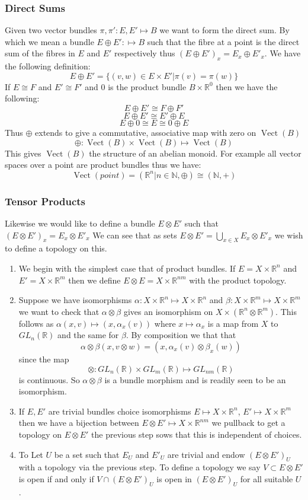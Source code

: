 \documentclass[a4paper,10pt]{article}
\theoremstyle{plain}%
\theoremstyle{definition}
\theoremstyle{remark}
\newcommand{\NN}{\mathbb{N}}
\newcommand{\RR}{\mathbb{R}}
\DeclareMathOperator{\Vect}{Vect}
\begin{document}
\subsubsection{Direct Sums}

Given two vector bundles $\pi,\pi':E,E'\mapsto B$ we want to form the direct sum. By which we mean a bundle 
$E\oplus E':\mapsto B$ such that the fibre at a point is the direct sum of the fibres in $E$
and $E'$ respectively thus $(E\oplus E')_x=E_x\oplus E'_x$. We have the following definition:
$$E\oplus E' = \{(v,w)\in E\times E' | \pi(v)=\pi(w) \}$$
If $E\cong F$ and $E'\cong F'$ and $0$ is the product bundle $B\times \RR^0$ then we have the following:
$$ E\oplus E'\cong F\oplus F'$$
$$ E\oplus E'\cong E'\oplus E$$
$$ E\oplus 0\cong E \cong 0\oplus E$$
Thus $\oplus$ extends to give a commutative, associative map with zero on $\Vect(B)$
$$\oplus :\Vect(B)\times \Vect(B)\mapsto \Vect(B)$$
This gives $\Vect(B)$ the structure of an abelian monoid. For example all vector spaces over a point
are product bundles thus we have:
$$\Vect(point)=({\RR^n|n\in\NN},\oplus)\cong (\NN,+)$$

\subsubsection{Tensor Products}

Likewise we would like to define a bundle $E\otimes E'$ such that $(E\otimes E')_x=E_x\otimes E'_x$
We can see that as sets $E\otimes E'=\bigcup_{x\in X}E_x\otimes E'_x$ we wish to define a topology on this.
\begin{enumerate}
 \item We begin with the simplest case that of product bundles. If $E=X\times \RR^n$ and $E'=X\times \RR^m$ 
then we define $E\otimes E = X\times \RR^{n m}$ with the product topology.
 \item Suppose we have isomorphisms $\alpha:X\times\RR^n\mapsto X\times\RR^n$ and 
$\beta:X\times\RR^m\mapsto X\times\RR^m$ we want to check that $\alpha\otimes\beta$ gives an
isomorphism on $X\times(\RR^n\otimes\RR^m)$. This follows as $\alpha(x,v)\mapsto(x,\alpha_x(v))$ where 
$x\mapsto\alpha_x$ is a map from $X$ to $GL_n(\RR)$ and the same for $\beta$. By composition we that that
$$\alpha\otimes\beta(x,v\otimes w)=(x,\alpha_x(v)\otimes\beta_x(w))$$
since the map
$$\otimes:GL_n(\RR)\times GL_m(\RR)\mapsto GL_{n m}(\RR)$$
is continuous. So $\alpha\otimes\beta$ is a bundle morphism and is readily seen to be an isomorphism. 
 \item If $E, E'$ are trivial bundles choice isomorphisms $E\mapsto X\times\RR^n$, $E'\mapsto X\times\RR^m$
then we have a bijection between $E\otimes E'\mapsto X\times\RR^{n m}$ we pullback to get a topology 
on $E\otimes E'$ the previous step sows that this is independent of choices.
 \item To Let $U$ be a set such that $E_U$ and $E'_U$ are trivial and endow $(E\otimes E')_U$ with a topology via the previous
step. To define a topology we say $V\subset E\otimes E'$ is open if and only if $V\cap (E\otimes E')_U$ is open in $(E\otimes E')_U$
for all suitable $U$.
\end{enumerate}
\end{document}
